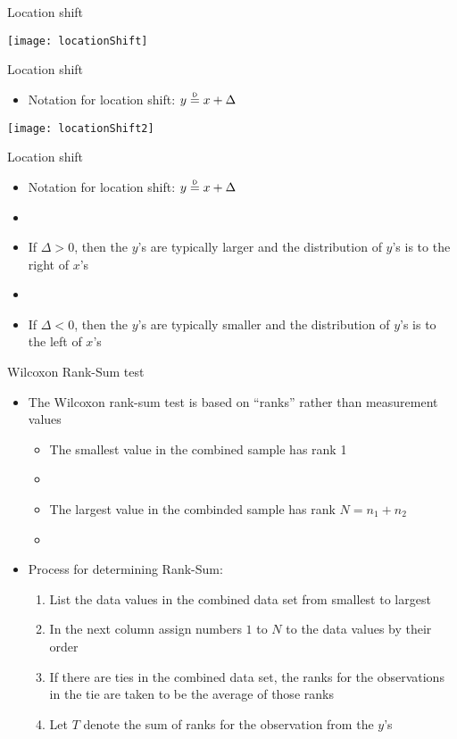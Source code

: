 \documentclass[xcolor=dvipsnames]{beamer}
\newcommand\myeq{\mathrel{\overset{\makebox[0pt]{\mbox{\normalfont\tiny\sffamily D}}}{=}}}
\begin{document}
\begin{frame}{Location shift}
	\begin{center}
		\texttt{[image: locationShift]}
	\end{center}
\end{frame}

\begin{frame}{Location shift}
	\begin{itemize}
		\item Notation for location shift: $y \myeq x + \Delta$
	\end{itemize}
\begin{center}
	\texttt{[image: locationShift2]}
\end{center}
\end{frame}

\begin{frame}{Location shift}
	\begin{itemize}
		\item Notation for location shift: $y \myeq x + \Delta$ \pause
		\item[]
		\item If $\Delta > 0$, then the $y$'s are typically larger and the distribution of $y$'s is to the right of $x$'s \pause
		\item[]
		\item If $\Delta < 0$, then the $y$'s are typically smaller and the distribution of $y$'s is to the left of $x$'s
	\end{itemize}
\end{frame}

\begin{frame}{Wilcoxon Rank-Sum test}
	\begin{itemize}
		\item The Wilcoxon rank-sum test is based on ``ranks'' rather than measurement values \pause
		\begin{itemize}
			\item The smallest value in the combined sample has rank 1 \pause
			\item[]
			\item The largest value in the combinded sample has rank $N = n_1 + n_2$
			\item[]
		\end{itemize}
	\item Process for determining Rank-Sum:
		\begin{enumerate}
		\item List the data values in the combined data set from smallest to largest \pause
		\item In the next column assign numbers $1$ to $N$ to the data values by their order \pause
		\item If there are ties in the combined data set, the ranks for the observations in the tie are taken to be the average of those ranks \pause
		\item Let $T$ denote the sum of ranks for the observation from the $y$'s
	\end{enumerate}
	\end{itemize}
\end{frame}
\end{document}
